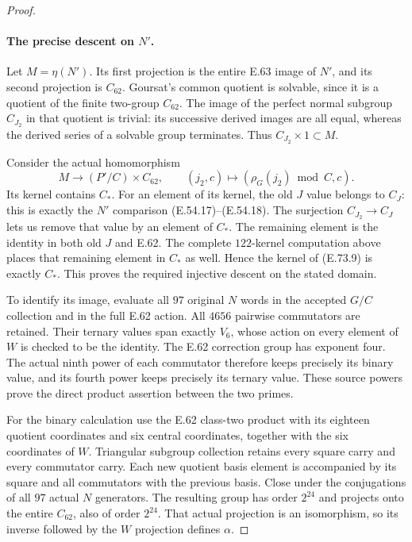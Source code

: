 \begin{proof}
\paragraph{The precise descent on $N'$.}
Let $M=\eta(N')$. Its first projection is the entire E.63
image of $N'$, and its second projection is $C_{62}$.
Goursat's common quotient is solvable, since it is a quotient
of the finite two-group $C_{62}$. The image of the perfect
normal subgroup $C_{J_2}$ in that quotient is trivial: its
successive derived images are all equal, whereas the derived
series of a solvable group terminates. Thus
$C_{J_2}\times1\subset M$.

Consider the actual homomorphism
\[
 M\longrightarrow (P'/C)\times C_{62},
 \qquad (j_2,c)\longmapsto(\rho_G(j_2)\bmod C,c).
 \tag{E.73.9}
\]
Its kernel contains $C_*$. For an element of its kernel,
the old $J$ value belongs to $C_J$: this is exactly the
$N'$ comparison (E.54.17)--(E.54.18). The surjection
$C_{J_2}\to C_J$ lets us remove that value by an element
of $C_*$. The remaining element is the identity in both
old $J$ and E.62. The complete $122$-kernel computation
above places that remaining element in $C_*$ as well.
Hence the kernel of (E.73.9) is exactly $C_*$. This proves
the required injective descent on the stated domain.

To identify its image, evaluate all $97$ original $N$ words
in the accepted $G/C$ collection and in the full E.62 action.
All $4656$ pairwise commutators are retained. Their ternary
values span exactly $V_6$, whose action on every element of
$W$ is checked to be the identity. The E.62 correction group
has exponent four. The actual ninth power of each commutator
therefore keeps precisely its binary value, and its fourth
power keeps precisely its ternary value. These source powers
prove the direct product assertion between the two primes.

For the binary calculation use the E.62 class-two product
with its eighteen quotient coordinates and six central
coordinates, together with the six coordinates of $W$.
Triangular subgroup collection retains every square carry
and every commutator carry. Each new quotient basis element
is accompanied by its square and all commutators with the
previous basis. Close under the conjugations of all $97$
actual $N$ generators. The resulting group has order
$2^{24}$ and projects onto the entire $C_{62}$, also of
order $2^{24}$. That actual projection is an isomorphism,
so its inverse followed by the $W$ projection defines
$\alpha$.


\end{proof}
